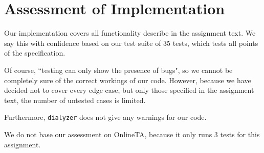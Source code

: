 \documentclass{article}
\begin{document}
\section{Assessment of Implementation}
Our implementation covers all functionality describe in the assignment text. We say this with confidence based on our test suite of 35 tests, which tests all points of the specification.

Of course, ``testing can only show the presence of bugs", so we cannot be completely sure of the correct workings of our code. However, because we have decided not to cover every edge case, but only those specified in the assignment text, the number of untested cases is limited.

Furthermore, \texttt{dialyzer} does not give any warnings for our code.

We do not base our assessment on OnlineTA, because it only runs 3 tests for this assignment. 
\end{document}
